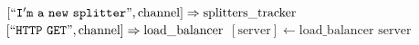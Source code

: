 \documentclass{article}
\begin{document}
\pagestyle{empty}

\newcommand{\send}{\Rightarrow}
\newcommand{\sendto}{\rightarrow}
\newcommand{\recv}{\Leftarrow}
\algrenewcommand\textproc{\textrm}

\begin{algorithmic}

  \algrenewcommand{}

  \State $[``\mathtt{I'm~a~new~splitter}", \text{channel}] \send \text{splitters\_tracker}$
  \State $[``\mathtt{HTTP~GET}", \text{channel}] \send \text{load\_balancer}$
  \State $[\text{server}] \gets \text{load\_balancer}$
  \State \Return $\text{server}$
  \EndFunction
  

  \EndProcedure
\end{algorithmic}
\end{document}
